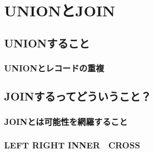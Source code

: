 \chapter{UNIONとJOIN}

\section{UNIONすること}

\subsection{UNIONとレコードの重複}

\section{JOINするってどういうこと？}

\subsection{JOINとは可能性を網羅すること}

\subsection{LEFT RIGHT INNER　CROSS}

